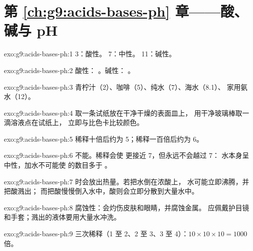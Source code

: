 \section*{第 \ref{ch:g9:acids-bases-ph} 章——酸、碱与 pH}

\begin{solution}{exo:g9:acids-bases-ph:1}
 3：酸性。 7：中性。 11：碱性。
\end{solution}

\begin{solution}{exo:g9:acids-bases-ph:2}
酸性： 。碱性： 。
\end{solution}

\begin{solution}{exo:g9:acids-bases-ph:3}
青柠汁（2）、咖啡（5）、纯水（7）、海水（8.1）、
家用氨水（12）。
\end{solution}

\begin{solution}{exo:g9:acids-bases-ph:4}
取一条试纸放在干净干燥的表面皿上，
用干净玻璃棒取一滴溶液点在试纸上，
立即与比色卡比较颜色。
\end{solution}

\begin{solution}{exo:g9:acids-bases-ph:5}
稀释十倍后约为 5；稀释一百倍后约为 6。
\end{solution}

\begin{solution}{exo:g9:acids-bases-ph:6}
不能。稀释会使  更接近 7，但永远不会越过 7：
水本身呈中性，加水不可能使  
的数目多于  。
\end{solution}

\begin{solution}{exo:g9:acids-bases-ph:7}
时会放出热量。若把水倒在浓酸上，
水可能立即沸腾，并把酸溅出；
而把酸慢慢倒入水中，酸则会立即分散到大量水中。
\end{solution}

\begin{solution}{exo:g9:acids-bases-ph:8}
腐蚀性：会灼伤皮肤和眼睛，并腐蚀金属。
应佩戴护目镜和手套；溅出的液体要用大量水冲洗。
\end{solution}

\begin{solution}{exo:g9:acids-bases-ph:9}
三次稀释（1 至 2、2 至 3、3 至 4）：$10 \times 10 \times 10 =
1000$ 倍。
\end{solution}

